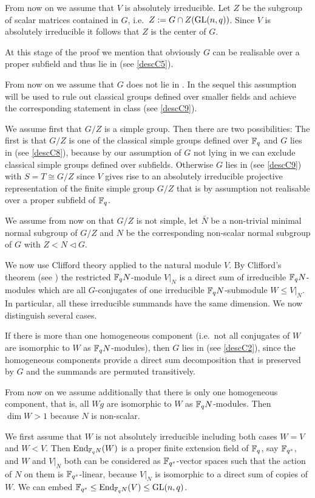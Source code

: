 From now on we assume that $V$ is absolutely irreducible. Let $Z$ be the
subgroup of scalar matrices contained in $G$, i.e.~$Z := G \cap
Z(\GL(n,q))$. Since $V$ is absolutely irreducible it follows that $Z$ is
the center of $G$.

At this stage of the proof we mention that obviously $G$ can be
realisable over a proper subfield and thus lie in  (see
\ref{descC5}).

From now on we assume that $G$ does not lie in . In the sequel this 
assumption will be used to rule out classical groups defined over
smaller fields and achieve the corresponding statement in class 
(see \ref{descC9}).

We assume first that $G/Z$ is a simple group. Then there are two possibilities:
The first is that $G/Z$ is one of the
classical simple groups defined over $\mathbb{F}_q$ and $G$ lies in  (see
\ref{descC8}), because by our assumption of $G$ not lying in  we can
exclude classical simple groups defined over subfields. Otherwise
$G$ lies in  (see \ref{descC9}) with
$S=T \cong G/Z$ since $V$ gives rise to an absolutely irreducible
projective representation of the finite simple group $G/Z$ that
is by assumption not realisable over a proper subfield of $\mathbb{F}_q$.

We assume from now on that $G/Z$ is not simple, let $\bar N$
be a non-trivial minimal normal subgroup of $G/Z$ and $N$ be
the corresponding non-scalar normal subgroup of $G$ with $Z < N
\triangleleft G$.

We now use Clifford theory applied to the natural module $V$. By Clifford's
theorem (see \cite[(49.2) and (49.7)]{CR0}) the restricted $\mathbb{F}_q N$-module
$V|_N$ is a direct sum of irreducible $\mathbb{F}_q N$-modules which are all
$G$-conjugates of one irreducible $\mathbb{F}_q N$-submodule $W \le V|_N$. In
particular, all these irreducible summands have the same dimension. We now
distinguish several cases.

If there is more than one homogeneous component (i.e.~not all conjugates of
$W$ are isomorphic to $W$ as $\mathbb{F}_q N$-modules), then $G$ lies in 
(see \ref{descC2}),
since the homogeneous components provide a direct sum decomposition that is
preserved by $G$ and the summands are permuted transitively.

From now on we assume additionally that there is only one homogeneous
component, that is, all $Wg$ are isomorphic to $W$ as $\mathbb{F}_q N$-modules.
Then $\dim W > 1$ because $N$ is non-scalar.

We first assume that $W$ is not absolutely irreducible including both
cases $W = V$ and $W < V$. Then $\End_{\F_q N}(W)$ is a proper finite
extension field of $\mathbb{F}_q$, say $\mathbb{F}_{q^s}$, and $W$ and $V|_N$
both can be considered as $\mathbb{F}_{q^s}$-vector spaces such that the action of
$N$ on them is $\mathbb{F}_{q^s}$-linear, because $V|_N$ is isomorphic to a direct
sum of copies of $W$. We can embed $\F_{q^s} \le \End_{\F_q N}(V) \le \GL(n,q)$.

